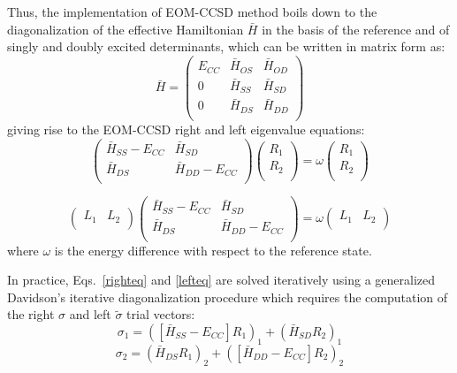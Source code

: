 \documentclass[journal=jctcce,manuscript=article]{achemso}
\begin{document}
Thus, the implementation of EOM-CCSD method boils down to the diagonalization of the effective Hamiltonian $\bar{H}$ in the basis of the reference and of singly and doubly excited determinants, which can be written in matrix form as:
\begin{equation}
\bar{H} = 
\begin{pmatrix}
E_{CC} & \bar{H}_{OS} & \bar{H}_{OD} \\
0 & \bar{H}_{SS} & \bar{H}_{SD} \\
0 & \bar{H}_{DS} & \bar{H}_{DD} \\
\end{pmatrix}
\end{equation}
giving rise to the EOM-CCSD right and left eigenvalue equations:
\begin{equation}
\label{righteq}
\begin{pmatrix}
\bar{H}_{SS} - E_{CC} & \bar{H}_{SD} \\
\bar{H}_{DS} & \bar{H}_{DD} - E_{CC} \\
\end{pmatrix}
\begin{pmatrix}
R_1 \\
R_2 \\
\end{pmatrix} 
= \omega 
\begin{pmatrix}
R_1 \\
R_2 \\
\end{pmatrix}
\end{equation}

\begin{equation}
\label{lefteq}
\begin{pmatrix}
L_1 & L_2 \\
\end{pmatrix} 
\begin{pmatrix}
\bar{H}_{SS} - E_{CC} & \bar{H}_{SD} \\
\bar{H}_{DS} & \bar{H}_{DD} - E_{CC} \\
\end{pmatrix}
= \omega
\begin{pmatrix}
L_1 & L_2 \\
\end{pmatrix}
\end{equation}
where $\omega$ is the energy difference with respect to the reference state.

In practice, Eqs.~\eqref{righteq} and \eqref{lefteq} are solved iteratively using a generalized Davidson's iterative diagonalization procedure\cite{Davidson,hirao1982generalization,rettrup1982iterative} which requires the computation of the right $\sigma$ and left $\tilde{\sigma}$ trial vectors:
\begin{equation} 
\sigma_1 = ([\bar{H}_{SS}-E_{CC}]R_1)_1 + (\bar{H}_{SD}R_2)_1
\end{equation}
\begin{equation} 
\sigma_2 = (\bar{H}_{DS}R_1)_2 + ([\bar{H}_{DD}-E_{CC}]R_2)_2
\end{equation}
\end{document}
